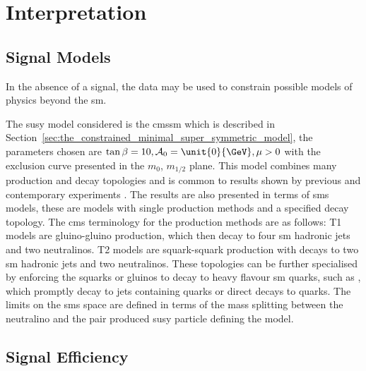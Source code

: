 \chapter{Interpretation} %
\label{cha:interpretation}


\section{Signal Models} %
\label{sec:signal_models}
In the absence of a signal, the data may be used to constrain possible models of physics beyond the \ac{sm}.

The \ac{susy} model considered is the \ac{cmssm} which is 
described in Section~\ref{sec:the_constrained_minimal_super_symmetric_model}, 
the parameters chosen are $\tan\beta = 10, \mathcal{A}_{0} = \unit{0}{\GeV}, 
\mu > 0$ with the exclusion curve presented in the $m_{0}$, $m_{1/2}$ plane. 
This model combines many production and decay topologies and is common to 
results shown by previous and contemporary experiments .
The results are also presented in terms of \ac{sms} models, these are 
models with single production methods and a specified decay topology. The 
\ac{cms} terminology for the production methods are as follows: T1 models are 
gluino-gluino production, which then decay to four \ac{sm} hadronic jets and 
two neutralinos. T2 models are squark-squark production with decays to two 
\ac{sm} hadronic jets and two neutralinos.
These topologies can be further specialised by enforcing the squarks or gluinos 
to decay to heavy flavour \ac{sm} quarks, such as \Ptop, which promptly decay 
to jets containing \Pbottom quarks or direct decays to \Pbottom quarks. The 
limits on the \ac{sms} space are defined in terms of the mass splitting between 
the neutralino and the pair produced \ac{susy} particle defining the model.
\section{Signal Efficiency} %
\label{sub:signal_efficiency}
